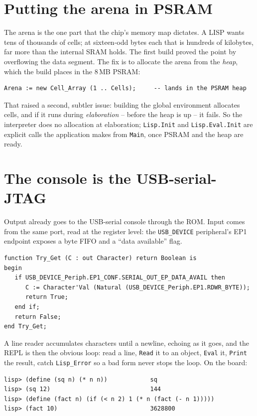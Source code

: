 \section{Putting the arena in PSRAM}

The arena is the one part that the chip's memory map dictates. A LISP wants tens of
thousands of cells; at sixteen-odd bytes each that is hundreds of kilobytes, far
more than the internal SRAM holds. The first build proved the point by overflowing
the data segment. The fix is to allocate the arena from the \emph{heap}, which the
build places in the 8\,MB PSRAM:

\begin{lstlisting}
Arena := new Cell_Array (1 .. Cells);     -- lands in the PSRAM heap
\end{lstlisting}

That raised a second, subtler issue: building the global environment allocates
cells, and if it runs during \emph{elaboration} -- before the heap is up -- it
fails. So the interpreter does no allocation at elaboration; \texttt{Lisp.Init} and
\texttt{Lisp.Eval.Init} are explicit calls the application makes from \texttt{Main},
once PSRAM and the heap are ready.

\section{The console is the USB-serial-JTAG}

Output already goes to the USB-serial console through the ROM. Input comes from the
same port, read at the register level: the \texttt{USB\_DEVICE} peripheral's EP1
endpoint exposes a byte FIFO and a ``data available'' flag.

\begin{lstlisting}
function Try_Get (C : out Character) return Boolean is
begin
   if USB_DEVICE_Periph.EP1_CONF.SERIAL_OUT_EP_DATA_AVAIL then
      C := Character'Val (Natural (USB_DEVICE_Periph.EP1.RDWR_BYTE));
      return True;
   end if;
   return False;
end Try_Get;
\end{lstlisting}

A line reader accumulates characters until a newline, echoing as it goes, and the
REPL is then the obvious loop: read a line, \texttt{Read} it to an object,
\texttt{Eval} it, \texttt{Print} the result, catch \texttt{Lisp\_Error} so a bad
form never stops the loop. On the board:

\begin{lstlisting}[style=sh]
lisp> (define (sq n) (* n n))            sq
lisp> (sq 12)                            144
lisp> (define (fact n) (if (< n 2) 1 (* n (fact (- n 1)))))
lisp> (fact 10)                          3628800
\end{lstlisting}

